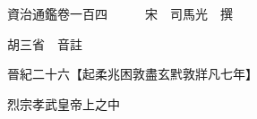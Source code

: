 










 


 
 


 

  
  
  
  
  





  
  
  
  
  
 
  

  

  
  
  



  

 
 

  
   




  

  
  


  　　資治通鑑卷一百四　　　宋　司馬光　撰

　　胡三省　音註

　　晉紀二十六【起柔兆困敦盡玄黓敦牂凡七年】

　　烈宗孝武皇帝上之中

